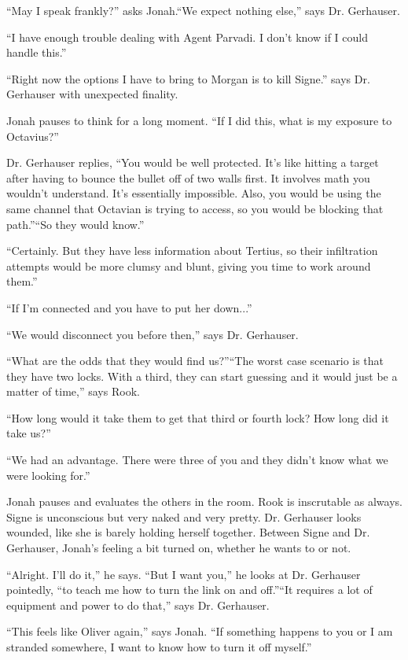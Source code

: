 ``May I speak frankly?'' asks Jonah.``We expect nothing else,'' says Dr. Gerhauser.

``I have enough trouble dealing with Agent Parvadi.  I don't know if I could handle this.''

``Right now the options I have to bring to Morgan is to kill Signe.'' says Dr. Gerhauser with unexpected finality.

Jonah pauses to think for a long moment.  ``If I did this, what is my exposure to Octavius?''

Dr. Gerhauser replies, ``You would be well protected.  It's like hitting a target after having to bounce the bullet off of two walls first.  It involves math you wouldn't understand.  It's essentially impossible.  Also, you would be using the same channel that Octavian is trying to access, so you would be blocking that path.''``So they would know.''

``Certainly.  But they have less information about Tertius, so their infiltration attempts would be more clumsy and blunt, giving you time to work around them.''

``If I'm connected and you have to put her down...''

``We would disconnect you before then,'' says Dr. Gerhauser.

``What are the odds that they would find us?''``The worst case scenario is that they have two locks.  With a third, they can start guessing and it would just be a matter of time,'' says Rook.

``How long would it take them to get that third or fourth lock?   How long did it take us?''

``We had an advantage.  There were three of you and they didn't know what we were looking for.''

Jonah pauses and evaluates the others in the room.  Rook is inscrutable as always.  Signe is unconscious but very naked and very pretty.  Dr. Gerhauser looks wounded, like she is barely holding herself together.  Between Signe and Dr. Gerhauser, Jonah's feeling a bit turned on, whether he wants to or not.

``Alright.  I'll do it,'' he says. ``But I want you,'' he looks at Dr. Gerhauser pointedly, ``to teach me how to turn the link on and off.''``It requires a lot of equipment and power to do that,'' says Dr. Gerhauser.

``This feels like Oliver again,'' says Jonah.  ``If something happens to you or I am stranded somewhere, I want to know how to turn it off myself.''

